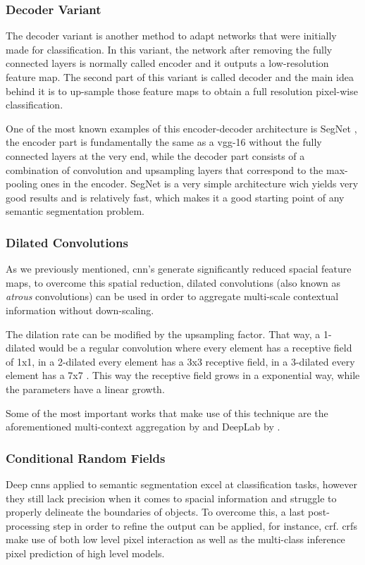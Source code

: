 \subsubsection{Decoder Variant}
The decoder variant is another method to adapt networks that were initially made for classification. In this variant, the network after removing the fully connected layers is normally called encoder and it outputs a low-resolution feature map. The second part of this variant is called decoder and the main idea behind it is to up-sample those feature maps to obtain a full resolution pixel-wise classification.

One of the most known examples of this encoder-decoder architecture is SegNet \cite{DBLP:journals/corr/BadrinarayananK15}, the encoder part is fundamentally the same as a \gls{vgg}-16 without the fully connected layers at the very end, while the decoder part consists of a combination of convolution and upsampling layers that correspond to the max-pooling ones in the encoder. SegNet is a very simple architecture wich yields very good results and is relatively fast, which makes it a good starting point of any semantic segmentation problem.


\subsubsection{Dilated Convolutions}
As we previously mentioned, \gls{cnn}'s generate significantly reduced spacial feature maps, to overcome this spatial reduction, dilated convolutions (also known as \textit{atrous} convolutions) can be used in order to aggregate multi-scale contextual information without down-scaling.

The dilation rate can be modified by the upsampling factor. That way, a 1-dilated would be a regular convolution where every element has a receptive field of 1x1, in a 2-dilated every element has a 3x3 receptive field, in a 3-dilated every element has a 7x7 . This way the receptive field grows in a exponential way, while the parameters have a linear growth.

Some of the most important works that make use of this technique are the aforementioned multi-context aggregation by \cite{yu2015multiscale} and DeepLab by \cite{DBLP:journals/corr/ChenPK0Y16}.

\subsubsection{Conditional Random Fields}
Deep \gls{cnn}s applied to semantic segmentation excel at classification tasks, however they still lack precision when it comes to spacial information and struggle to properly delineate the boundaries of objects. To overcome this, a last post-processing step in order to refine the output can be applied, for instance, \gls{crf}. \gls{crf}s make use of both low level pixel interaction as well as the multi-class inference pixel prediction of high level models.

